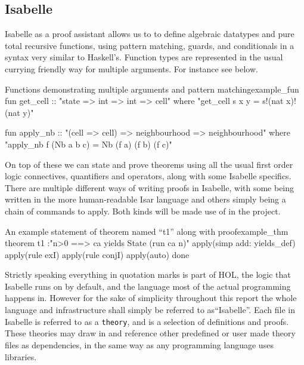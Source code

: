 \subsection{Isabelle}

Isabelle as a proof assistant allows us to to define algebraic datatypes and pure total recursive functions,
using pattern matching, guards, and conditionals in a syntax very similar to Haskell's.
Function types are represented in the usual currying friendly way for multiple arguments.
For instance see  below.

\begin{myminted}{Functions demonstrating multiple arguments and pattern matching}{example_fun}
    fun get_cell :: "state => int => int => cell" where
    "get_cell s x y = s!(nat x)!(nat y)"

    fun apply_nb :: "(cell => cell) => neighbourhood => neighbourhood" where
    "apply_nb f (Nb a b c) = Nb (f a) (f b) (f c)"
\end{myminted}

On top of these we can state and prove theorems using all the usual first order logic connectives, quantifiers and operators,
along with some Isabelle specifics.
There are multiple different ways of writing proofs in Isabelle,
with some being written in the more human-readable Isar language
and others simply being a chain of commands to apply.
Both kinds will be made use of in the project.

\begin{myminted}{An example statement of theorem named ``t1'' along with proof}{example_thm}
    theorem t1 :"n>0 ==> ca yields State (run ca n)"
      apply(simp add: yields_def)
      apply(rule exI)
      apply(rule conjI)
      apply(auto)
      done
\end{myminted}

Strictly speaking everything in quotation marks is part of HOL,
the logic that Isabelle runs on by default,
and the language most of the actual programming happens in.
However for the sake of simplicity throughout this report the whole language and infrastructure shall simply be referred to as``Isabelle''.
Each file in Isabelle is referred to as a \texttt{theory},
and is a selection of definitions and proofs.
These theories may draw in and reference other predefined or user made theory files as dependencies, in the same way as any programming language uses libraries.

